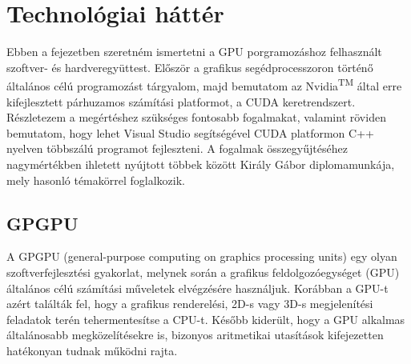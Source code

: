 \chapter{Technológiai háttér} \label{technologyChapter}
Ebben a fejezetben szeretném ismertetni a GPU porgramozáshoz felhasznált szoftver- és hardveregyüttest. Először a grafikus segédprocesszoron történő általános célú programozást tárgyalom, majd bemutatom az Nvidia\textsuperscript{TM} által erre kifejlesztett párhuzamos számítási platformot, a CUDA keretrendszert. Részletezem a megértéshez szükséges fontosabb fogalmakat, valamint röviden bemutatom, hogy lehet Visual Studio segítségével CUDA platformon C++ nyelven többszálú programot fejleszteni. A fogalmak összegyűjtéséhez nagymértékben ihletett nyújtott többek között Király Gábor diplomamunkája, mely hasonló témakörrel foglalkozik. \cite{kvantum_optim}

\section{GPGPU}
A GPGPU (general-purpose computing on graphics processing units) egy olyan
szoftverfejlesztési gyakorlat, melynek során a grafikus feldolgozóegységet (GPU) általános
célú számítási műveletek elvégzésére használjuk. \cite{kvantum_optim} Korábban a GPU-t azért találták fel, hogy a grafikus renderelési, 2D-s vagy 3D-s megjelenítési feladatok terén tehermentesítse a CPU-t. Később kiderült, hogy a GPU alkalmas általánosabb megközelítésekre is, bizonyos aritmetikai utasítások kifejezetten hatékonyan tudnak működni rajta.

